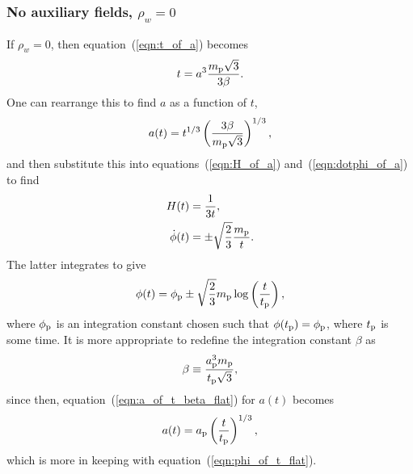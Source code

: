 \subsubsection{No auxiliary fields, $\rho_w=0$}
If $\rho_w=0$, then equation~(\ref{eqn:t_of_a}) becomes
%
\begin{equation}
  t = a^3 \frac{m_{\mathrm{p}}\sqrt{3}}{3\beta}.
\end{equation}
%
One can rearrange this to find $a$ as a function of $t$,
%
\begin{equation}
  a(t)
  =
  t^{1/3} \left(\frac{3\beta}{m_{\mathrm{p}}\sqrt{3}}\right)^{1/3},
  \label{eqn:a_of_t_beta_flat}
\end{equation}
%
and then substitute this into equations~(\ref{eqn:H_of_a}) and~(\ref{eqn:dotphi_of_a}) to find
%
\begin{align}
  H(t) 
  &= 
  \frac{1}{3t}, 
  \label{eqn:H_of_t_flat} 
  \\
  \dot{\phi}(t) 
  &= 
  \pm\sqrt{\frac{2}{3}}\frac{m_{\mathrm{p}}}{t}.
  \label{eqn:dotphi_of_t_flat}
\end{align}
%
The latter integrates to give
%
\begin{equation}
  \phi(t) 
  = 
  \phi_{\mathrm{p}} \pm\sqrt{\frac{2}{3}}m_{\mathrm{p}}\log\left(\frac{t}{t_{\mathrm{p}}}\right),  
  \label{eqn:phi_of_t_flat}
\end{equation}
%
where $\phi_{\mathrm{p}}$ is an integration constant chosen such that $\phi(t_{\mathrm{p}})=\phi_{\mathrm{p}}$, where $t_{\mathrm{p}}$ is some time. It is more appropriate to redefine the integration constant $\beta$ as
%
\begin{equation}
  \beta 
  \equiv 
  \frac{a_{\mathrm{p}}^3m_{\mathrm{p}}}{t_{\mathrm{p}}\sqrt{3}}, 
  \label{eqn:beta_def}
\end{equation}
%
since then, equation~(\ref{eqn:a_of_t_beta_flat}) for $a(t)$ becomes
%
\begin{equation}
  a(t) 
  = 
  a_{\mathrm{p}} \left(\frac{t}{t_{\mathrm{p}}}\right)^{1/3},
  \label{eqn:a_of_t_flat}
\end{equation}
%
which is more in keeping with equation~(\ref{eqn:phi_of_t_flat}).  

